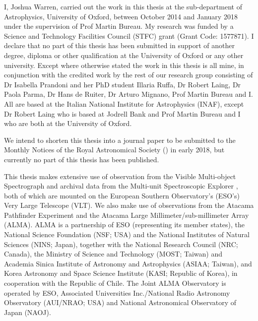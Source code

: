 \begin{originalitylong}
I, Joshua Warren, carried out the work in this thesis at the sub-department of Astrophysics, University of Oxford, between October 2014 and January 2018 under the supervision of Prof Martin Bureau. My research was funded by a Science and Technology Facilities Council (STFC) grant (Grant Code: 1577871). I declare that no part of this thesis has been submitted in support of another degree, diploma or other qualification at the University of Oxford or any other university. Except where otherwise stated the work in this thesis is all mine, in conjunction with the credited work by the rest of our research group consisting of Dr Isabella Prandoni and her PhD student Illaria Ruffa, Dr Robert Laing, Dr Paola Parma, Dr Hans de Ruiter, Dr Arturo Mignano, Prof Martin Bureau and I. All are based at the Italian National Institute for Astrophysics (INAF), except Dr Robert Laing who is based at Jodrell Bank and Prof Martin Bureau and I who are both at the University of Oxford.

We intend to shorten this thesis into a journal paper to be submitted to the Monthly Notices of the Royal Astronomical Society (\mnras) in early 2018, but currently no part of this thesis has been published. 

This thesis makes extensive use of observation from the Visible Multi-object Spectrograph \citep[VIMOS; ][]{LeFevre2003} and archival data from the Multi-unit Spectroscopic Explorer \citep[MUSE; ][]{Bacon2010}, both of which are mounted on the European Southern Observatory's (ESO's) Very Large Telescope (VLT). We also make use of observations from the Atacama Pathfinder Experiment \citep[APEX; ][]{Gusten2006} and the Atacama Large Millimeter/sub-millimeter Array (ALMA). ALMA is a partnership of ESO (representing its member states), the National Science Foundation (NSF; USA) and the National Institutes of Natural Sciences (NINS; Japan), together with the National Research Council (NRC; Canada), the Ministry of Science and Technology (MOST; Taiwan) and Academia Sinica Institute of Astronomy and Astrophysics (ASIAA; Taiwan), and Korea Astronomy and Space Science Institute (KASI; Republic of Korea), in cooperation with the Republic of Chile. The Joint ALMA Observatory is operated by ESO, Associated Universities Inc./National Radio Astronomy Observatory (AUI/NRAO; USA) and National Astronomical Observatory of Japan (NAOJ).


\end{originalitylong}
